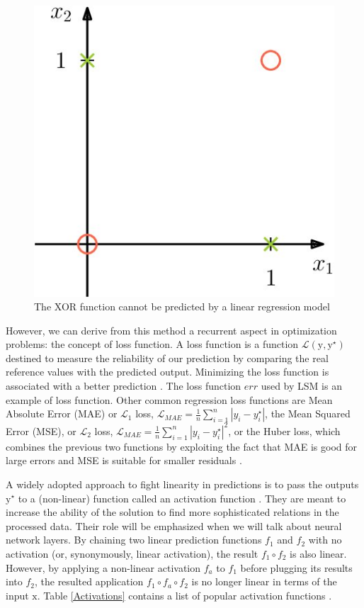 \begin{figure}[htbp]
	\centering
		\includegraphics[scale=1]{figures/xor_lin.jpg}
	\caption{The XOR function cannot be predicted by a linear regression model \cite{xorexample}}
	\label{FigXorLin}        
\end{figure}




\par However, we can derive from this method a recurrent aspect in optimization problems: the concept of loss function. A loss function is a function $\mathcal{L}(\mathrm{y}, \mathrm{y^\star})$ destined to 
measure the reliability of our prediction by comparing the real reference values with the predicted output. Minimizing the loss function is associated with a better prediction \cite{losssurvey}. The loss function 
$err$ used by LSM is an example of loss function. Other common regression loss functions are Mean Absolute Error (MAE) or $\mathcal{L}_1$ loss, $\mathcal{L}_{MAE} = \frac{1}{n}\sum_{i=1}^n{\left| y_i - y_i^\star \right|}$, the Mean Squared Error (MSE), or $\mathcal{L}_2$ loss, $\mathcal{L}_{MAE} = \frac{1}{n}\sum_{i=1}^n{\left| y_i - y_i^\star \right|^2}$, or the Huber loss, which combines the previous two functions by exploiting the fact that MAE is good for large errors and MSE is suitable for smaller residuals \cite{losssurvey}.


\par A widely adopted approach to fight linearity in predictions is to pass the outputs $\mathrm{y}^\star$ to a (non-linear) function called an activation function \cite{activsurvey}. They are meant to increase the ability of the solution to find more sophisticated relations in the processed data. Their role will be emphasized when we will talk about neural network layers. By chaining two linear prediction functions $f_1$ and $f_2$ with no activation (or, synonymously, linear activation), the result $f_1 \circ f_2$ is also linear. However, by applying a non-linear activation $f_a$ to $f_1$ before plugging its results into $f_2$, the resulted application $f_1 \circ f_a \circ f_2$ is no longer linear in terms of the input $\mathrm{x}$. Table \ref{Activations} contains a list of popular activation functions \cite{activsurvey}.


